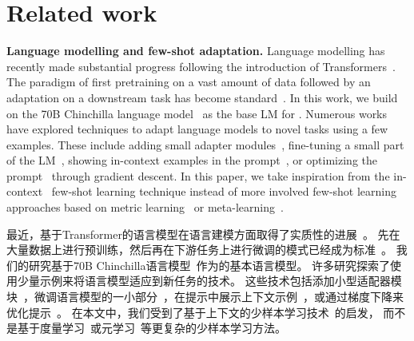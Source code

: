 \section{Related work}

\textbf{Language modelling and few-shot adaptation.}
Language modelling has recently made substantial progress following the introduction of Transformers~\citep{vaswani2017attention}.
The paradigm of first pretraining on a vast amount of data followed by an adaptation on a downstream task has become standard~\citep{mikolov2010recurrent,graves2013generating,jozefowicz2016exploring,howard2018universal,bert,t5,sutskever2011generating,gpt3}.
In this work, we build on the 70B Chinchilla language model~\citep{chinchilla} as the base LM for \largem{}.
Numerous works have explored techniques to adapt language models to novel tasks using a few examples.
These include adding small adapter modules~\citep{houlsby2019parameter}, fine-tuning a small part of the LM~\citep{zaken_bitfit_2022}, showing in-context examples in the prompt~\citep{gpt3}, or optimizing the prompt~\citep{li2021prefix,lester2021power} through gradient descent.
In this paper, we take inspiration from the in-context~\citep{gpt3} few-shot learning technique instead of more involved few-shot learning approaches based on metric learning~\citep{doersch2020crosstransformers,vinyals2016matching,snell2017prototypical,tian2020rethinking} or meta-learning~\citep{finn2017model,bertinetto2018meta,zintgraf2019fast,requeima2019fast,gordon2018meta,bertinetto2016learning}.

最近，基于Transformer的语言模型在语言建模方面取得了实质性的进展~\citep{vaswani2017attention}。 先在大量数据上进行预训练，然后再在下游任务上进行微调的模式已经成为标准~\citep{mikolov2010recurrent,graves2013generating,jozefowicz2016exploring,howard2018universal,bert,t5,sutskever2011generating,gpt3}。 我们的研究基于70B Chinchilla语言模型~\citep{chinchilla}作为\largem{}的基本语言模型。 
许多研究探索了使用少量示例来将语言模型适应到新任务的技术。 这些技术包括添加小型适配器模块~\citep{houlsby2019parameter}，微调语言模型的一小部分~\citep{zaken_bitfit_2022}，在提示中展示上下文示例~\citep{gpt3}，或通过梯度下降来优化提示~\citep{li2021prefix,lester2021power}。 在本文中，我们受到了基于上下文的少样本学习技术~\citep{gpt3}的启发，
而不是基于度量学习~\citep{doersch2020crosstransformers,vinyals2016matching,snell2017prototypical,tian2020rethinking}或元学习~\citep{finn2017model,bertinetto2018meta,zintgraf2019fast,requeima2019fast,gordon2018meta,bertinetto2016learning}等更复杂的少样本学习方法。

